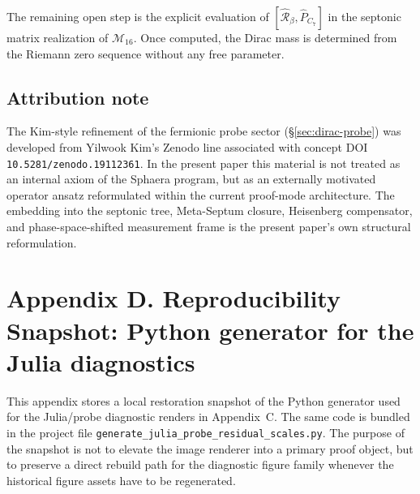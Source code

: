 \begin{remark}
The remaining open step is the explicit evaluation of
$[\hat{\mathcal{R}}_\beta,\hat P_{C_7}]$ in the septonic matrix
realization of $\mathcal{M}_{16}$.
Once computed, the Dirac mass is determined from the Riemann zero
sequence without any free parameter.
\end{remark}

\subsection{Attribution note}
\label{app:attribution-reintegrated}

The Kim-style refinement of the fermionic probe sector
(\S\ref{sec:dirac-probe}) was developed from Yilwook Kim's Zenodo line
associated with concept DOI \texttt{10.5281/zenodo.19112361}.
In the present paper this material is not treated as an internal axiom
of the Sphaera program, but as an externally motivated operator ansatz
reformulated within the current proof-mode architecture.
The embedding into the septonic tree, Meta-Septum closure, Heisenberg
compensator, and phase-space-shifted measurement frame is the present
paper's own structural reformulation.

\clearpage
\section*{Appendix D. Reproducibility Snapshot: Python generator for the Julia diagnostics}
\label{app:julia-python-generator}

This appendix stores a local restoration snapshot of the Python generator used for the Julia/probe diagnostic renders in Appendix~C. The same code is bundled in the project file \texttt{generate\_julia\_probe\_residual\_scales.py}. The purpose of the snapshot is not to elevate the image renderer into a primary proof object, but to preserve a direct rebuild path for the diagnostic figure family whenever the historical figure assets have to be regenerated.

